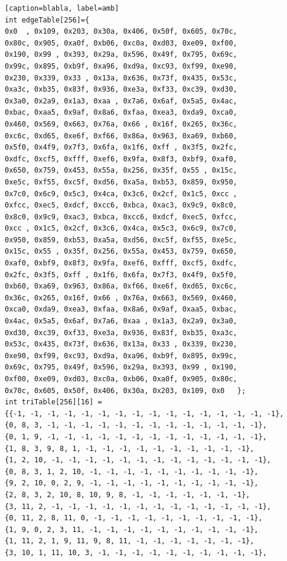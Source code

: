 \documentclass[12pt]{article}
\begin{document}
\begin{lstlisting}[frame=single, basicstyle=\scriptsize][caption=blabla, label=amb]
int edgeTable[256]={
0x0  , 0x109, 0x203, 0x30a, 0x406, 0x50f, 0x605, 0x70c,
0x80c, 0x905, 0xa0f, 0xb06, 0xc0a, 0xd03, 0xe09, 0xf00,
0x190, 0x99 , 0x393, 0x29a, 0x596, 0x49f, 0x795, 0x69c,
0x99c, 0x895, 0xb9f, 0xa96, 0xd9a, 0xc93, 0xf99, 0xe90,
0x230, 0x339, 0x33 , 0x13a, 0x636, 0x73f, 0x435, 0x53c,
0xa3c, 0xb35, 0x83f, 0x936, 0xe3a, 0xf33, 0xc39, 0xd30,
0x3a0, 0x2a9, 0x1a3, 0xaa , 0x7a6, 0x6af, 0x5a5, 0x4ac,
0xbac, 0xaa5, 0x9af, 0x8a6, 0xfaa, 0xea3, 0xda9, 0xca0,
0x460, 0x569, 0x663, 0x76a, 0x66 , 0x16f, 0x265, 0x36c,
0xc6c, 0xd65, 0xe6f, 0xf66, 0x86a, 0x963, 0xa69, 0xb60,
0x5f0, 0x4f9, 0x7f3, 0x6fa, 0x1f6, 0xff , 0x3f5, 0x2fc,
0xdfc, 0xcf5, 0xfff, 0xef6, 0x9fa, 0x8f3, 0xbf9, 0xaf0,
0x650, 0x759, 0x453, 0x55a, 0x256, 0x35f, 0x55 , 0x15c,
0xe5c, 0xf55, 0xc5f, 0xd56, 0xa5a, 0xb53, 0x859, 0x950,
0x7c0, 0x6c9, 0x5c3, 0x4ca, 0x3c6, 0x2cf, 0x1c5, 0xcc ,
0xfcc, 0xec5, 0xdcf, 0xcc6, 0xbca, 0xac3, 0x9c9, 0x8c0,
0x8c0, 0x9c9, 0xac3, 0xbca, 0xcc6, 0xdcf, 0xec5, 0xfcc,
0xcc , 0x1c5, 0x2cf, 0x3c6, 0x4ca, 0x5c3, 0x6c9, 0x7c0,
0x950, 0x859, 0xb53, 0xa5a, 0xd56, 0xc5f, 0xf55, 0xe5c,
0x15c, 0x55 , 0x35f, 0x256, 0x55a, 0x453, 0x759, 0x650,
0xaf0, 0xbf9, 0x8f3, 0x9fa, 0xef6, 0xfff, 0xcf5, 0xdfc,
0x2fc, 0x3f5, 0xff , 0x1f6, 0x6fa, 0x7f3, 0x4f9, 0x5f0,
0xb60, 0xa69, 0x963, 0x86a, 0xf66, 0xe6f, 0xd65, 0xc6c,
0x36c, 0x265, 0x16f, 0x66 , 0x76a, 0x663, 0x569, 0x460,
0xca0, 0xda9, 0xea3, 0xfaa, 0x8a6, 0x9af, 0xaa5, 0xbac,
0x4ac, 0x5a5, 0x6af, 0x7a6, 0xaa , 0x1a3, 0x2a9, 0x3a0,
0xd30, 0xc39, 0xf33, 0xe3a, 0x936, 0x83f, 0xb35, 0xa3c,
0x53c, 0x435, 0x73f, 0x636, 0x13a, 0x33 , 0x339, 0x230,
0xe90, 0xf99, 0xc93, 0xd9a, 0xa96, 0xb9f, 0x895, 0x99c,
0x69c, 0x795, 0x49f, 0x596, 0x29a, 0x393, 0x99 , 0x190,
0xf00, 0xe09, 0xd03, 0xc0a, 0xb06, 0xa0f, 0x905, 0x80c,
0x70c, 0x605, 0x50f, 0x406, 0x30a, 0x203, 0x109, 0x0   };
int triTable[256][16] =
{{-1, -1, -1, -1, -1, -1, -1, -1, -1, -1, -1, -1, -1, -1, -1, -1},
{0, 8, 3, -1, -1, -1, -1, -1, -1, -1, -1, -1, -1, -1, -1, -1},
{0, 1, 9, -1, -1, -1, -1, -1, -1, -1, -1, -1, -1, -1, -1, -1},
{1, 8, 3, 9, 8, 1, -1, -1, -1, -1, -1, -1, -1, -1, -1, -1},
{1, 2, 10, -1, -1, -1, -1, -1, -1, -1, -1, -1, -1, -1, -1, -1},
{0, 8, 3, 1, 2, 10, -1, -1, -1, -1, -1, -1, -1, -1, -1, -1},
{9, 2, 10, 0, 2, 9, -1, -1, -1, -1, -1, -1, -1, -1, -1, -1},
{2, 8, 3, 2, 10, 8, 10, 9, 8, -1, -1, -1, -1, -1, -1, -1},
{3, 11, 2, -1, -1, -1, -1, -1, -1, -1, -1, -1, -1, -1, -1, -1},
{0, 11, 2, 8, 11, 0, -1, -1, -1, -1, -1, -1, -1, -1, -1, -1},
{1, 9, 0, 2, 3, 11, -1, -1, -1, -1, -1, -1, -1, -1, -1, -1},
{1, 11, 2, 1, 9, 11, 9, 8, 11, -1, -1, -1, -1, -1, -1, -1},
{3, 10, 1, 11, 10, 3, -1, -1, -1, -1, -1, -1, -1, -1, -1, -1},

\end{lstlisting}
\end{document}
